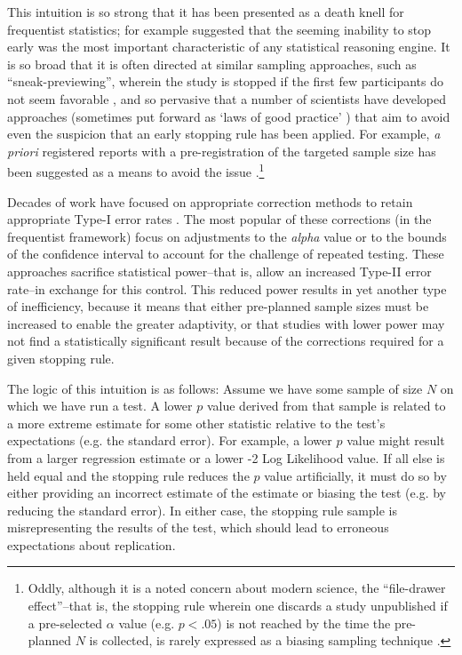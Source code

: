 \documentclass[man]{apa7}\usepackage[]{graphicx}\usepackage[]{xcolor}
\theoremstyle{definition}
\begin{document}
This intuition is so strong that it has been presented as a death knell for frequentist statistics; for example \textcite{Venderkerchove_2014} suggested that the seeming inability to stop early was the most important characteristic of any statistical reasoning engine.  It is so broad that it is often directed at similar sampling approaches, such as ``sneak-previewing'', wherein the study is stopped if the first few participants do not seem favorable \parencite[see, e.g.][]{armitage1969repeated}, and so pervasive that a number of scientists have developed approaches (sometimes put forward as `laws of good practice' \parencite{simmons2011false}) that aim to avoid even the suspicion that an early stopping rule has been applied. For example, \textit{a priori} registered reports with a pre-registration of the targeted sample size has been suggested as a means to avoid the issue \parencite{nosek2014registered}.\footnote{Oddly, although it is a noted concern about modern science, the ``file-drawer effect''--that is, the stopping rule wherein one discards a study unpublished if a pre-selected $\alpha$ value (e.g. $p < .05$) is not reached by the time the pre-planned $N$ is collected, is rarely expressed as a biasing sampling technique \parencite{rosenthal1979file}.}

Decades of work have focused on appropriate correction methods to retain appropriate Type-I error rates \parencite[see][for an overview]{shaffer1995multiple}. The most popular of these corrections (in the frequentist framework) focus on adjustments to the \textit{alpha} value or to the bounds of the confidence interval to account for the challenge of repeated testing\parencite[see, e.g.][]{pocock1977group, o1979multiple}.  These approaches sacrifice statistical power--that is, allow an increased Type-II error rate--in exchange for this control.  This reduced power results in yet another type of inefficiency, because it means that either pre-planned sample sizes must be increased to enable the greater adaptivity, or that studies with lower power may not find a statistically significant result because of the corrections required for a given stopping rule.

The logic of this intuition is as follows: Assume we have some sample of size $N$ on which we have run a test.  A lower $p$ value derived from that sample is related to a more extreme estimate for some other statistic relative to the test's expectations (e.g. the standard error).  For example, a lower $p$ value might result from a larger regression estimate or a lower -2 Log Likelihood value.  If all else is held equal and the stopping rule reduces the $p$ value artificially, it must do so by either providing an incorrect estimate of the estimate or biasing the test (e.g. by reducing the standard error).  In either case, the stopping rule sample is misrepresenting the results of the test, which should lead to erroneous expectations about replication.
\end{document}
